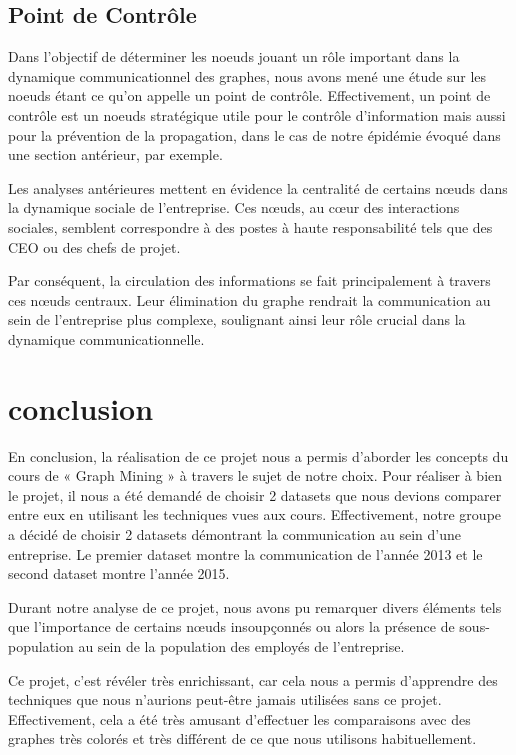 \documentclass{article}
\begin{document}
\subsection{Point de Contrôle}


Dans l’objectif de déterminer les noeuds jouant un rôle important dans la dynamique communicationnel des graphes, nous avons mené une étude sur les noeuds étant ce qu’on appelle un point de contrôle. Effectivement, un point de contrôle est un noeuds stratégique utile pour le contrôle d’information mais aussi pour la prévention de la propagation, dans le cas de notre épidémie évoqué dans une section antérieur, par exemple.

Les analyses antérieures mettent en évidence la centralité de certains nœuds dans la dynamique sociale de l'entreprise. Ces nœuds, au cœur des interactions sociales, semblent correspondre à des postes à haute responsabilité tels que des CEO ou des chefs de projet.

Par conséquent, la circulation des informations se fait principalement à travers ces nœuds centraux. Leur élimination du graphe rendrait la communication au sein de l'entreprise plus complexe, soulignant ainsi leur rôle crucial dans la dynamique communicationnelle.

\section{conclusion}

En conclusion, la réalisation de ce projet nous a permis d’aborder les concepts du cours de « Graph Mining » à travers le sujet de notre choix. Pour réaliser à bien le projet, il nous a été demandé de choisir 2 datasets que nous devions comparer entre eux en utilisant les techniques vues aux cours. Effectivement, notre groupe a décidé de choisir 2 datasets démontrant la communication au sein d’une entreprise. Le premier dataset montre la communication de l’année 2013 et le second dataset montre l’année 2015.

Durant notre analyse de ce projet, nous avons pu remarquer divers éléments tels que l’importance de certains nœuds insoupçonnés ou alors la présence de sous-population au sein de la population des employés de l’entreprise.

Ce projet, c’est révéler très enrichissant, car cela nous a permis d’apprendre des techniques que nous n’aurions peut-être jamais utilisées sans ce projet. Effectivement, cela a été très amusant d’effectuer les comparaisons avec des graphes très colorés et très différent de ce que nous utilisons habituellement.
\end{document}
